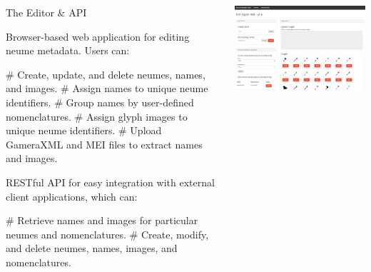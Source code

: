 \documentclass[final]{beamer}
\newlength{\onecolwid}
\newcommand{\blockSpace}{\vskip 0.75ex}
\begin{document}
\begin{frame}[fragile,t]
\begin{columns}
\begin{column}{\onecolwid}

\end{column}

\end{columns}

\vspace{-2cm}

\begin{columns}
\begin{column}{\onecolwid}
\begin{block}{The Editor \& API}
\raggedright
Browser-based web application for editing neume metadata.  Users can:
\begin{easylist}[itemize]
# Create, update, and delete neumes, names, and images.
# Assign names to unique neume identifiers.
# Group names by user-defined nomenclatures.
# Assign glyph images to unique neume identifiers.
# Upload GameraXML and MEI files to extract names and images.
\end{easylist}

RESTful API for easy integration with external client applications, which can:
\begin{easylist}[itemize]
# Retrieve names and images for particular neumes and nomenclatures.
# Create, modify, and delete  neumes, names, images, and nomenclatures.
\end{easylist}
\end{block}
\end{column}

\begin{column}{\onecolwid}
\begin{block}{}
\centering
\includegraphics[width=\onecolwid]{images/web-interface.png} 


\end{block}
\end{column}
\end{columns}
\end{frame}
\end{document}

